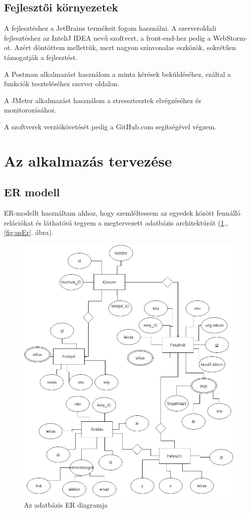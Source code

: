 \subsection{Fejlesztői környezetek}

A fejlesztéshez a JetBrains termékeit fogom használni. A szerveroldali fejlesztéshez az InteliJ IDEA nevű szoftvert, a front-end-hez pedig a WebStorm-ot. Azért döntöttem mellettük, mert nagyon színvonalas eszközök, sokrétűen támogatják a fejlesztést.
 
A Postman alkalmazást használom a minta kérések beküldéséhez, ezáltal a funkciók teszteléséhez szerver oldalon.

A JMeter alkalmazást használom a stressztesztek elvégzéséhez és monitorozásához.

A szoftverek verziókövetését pedig a GitHub.com segítségével végzem.

\section{Az alkalmazás tervezése}

\subsection{ER modell}

ER-modellt használtam ahhoz, hogy szemléltessem az egyedek között fennálló relációkat és láthatóvá tegyem a megtervezett adatbázis architektúrát (\ref{fig:er}., \ref{fig:usEr}. ábra).

\begin{figure}
\centering
\includegraphics[scale=0.6]{kepek/er.jpg}
\caption{Az adatbázis ER diagramja}
\label{fig:er}
\end{figure}

